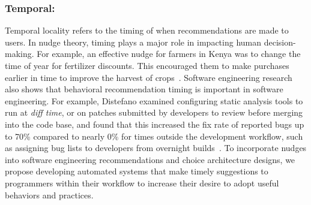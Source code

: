 \subsubsection{Temporal:} Temporal locality refers to the timing of when recommendations are made to users. In nudge theory, timing plays a major role in impacting human decision-making. For example, an effective nudge for farmers in Kenya was to change the time of year for fertilizer discounts. This encouraged them to make purchases earlier in time to improve the harvest of crops~\cite{duflo2011nudging}. Software engineering research also shows that behavioral recommendation timing is important in software engineering. For example, Distefano examined configuring static analysis tools to run at \textit{diff time}, or on patches submitted by developers to review before merging into the code base, and found that this increased the fix rate of reported bugs up to 70\% compared to nearly 0\% for times outside the development workflow, such as assigning bug lists to developers from overnight builds~\cite{Distefano2019Facebook}. To incorporate nudges into software engineering recommendations and choice architecture designs, we propose developing automated systems that make timely suggestions to programmers within their workflow to increase their desire to adopt useful behaviors and practices.

\newpage




